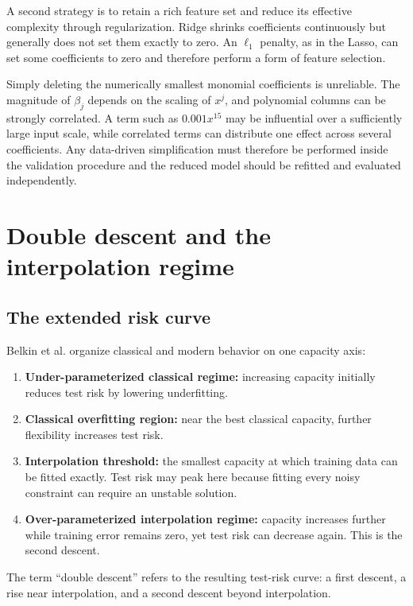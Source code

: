 \documentclass[11pt,a4paper]{article}
\begin{document}
A second strategy is to retain a rich feature set and reduce its effective complexity through regularization. Ridge shrinks coefficients continuously but generally does not set them exactly to zero. An $\ell_1$ penalty, as in the Lasso, can set some coefficients to zero and therefore perform a form of feature selection.

Simply deleting the numerically smallest monomial coefficients is unreliable. The magnitude of $\beta_j$ depends on the scaling of $x^j$, and polynomial columns can be strongly correlated. A term such as $0.001x^{15}$ may be influential over a sufficiently large input scale, while correlated terms can distribute one effect across several coefficients. Any data-driven simplification must therefore be performed inside the validation procedure and the reduced model should be refitted and evaluated independently.

\section{Double descent and the interpolation regime}
\label{sec:double-descent}

\subsection{The extended risk curve}

Belkin et al. organize classical and modern behavior on one capacity axis:
\begin{enumerate}
  \item \textbf{Under-parameterized classical regime:} increasing capacity initially reduces test risk by lowering underfitting.
  \item \textbf{Classical overfitting region:} near the best classical capacity, further flexibility increases test risk.
  \item \textbf{Interpolation threshold:} the smallest capacity at which training data can be fitted exactly. Test risk may peak here because fitting every noisy constraint can require an unstable solution.
  \item \textbf{Over-parameterized interpolation regime:} capacity increases further while training error remains zero, yet test risk can decrease again. This is the second descent.
\end{enumerate}

The term ``double descent'' refers to the resulting test-risk curve: a first descent, a rise near interpolation, and a second descent beyond interpolation.
\end{document}
